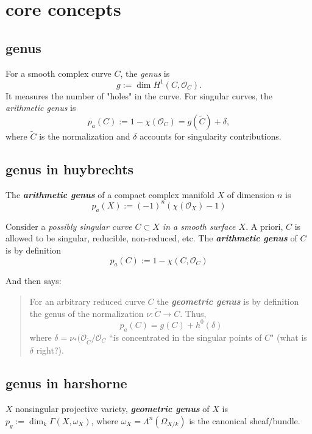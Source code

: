 \section{core concepts}

\subsection{genus}
For a smooth complex curve \( C \), the \emph{genus} is
\[
g := \dim H^1(C, \mathcal{O}_C).
\]
It measures the number of "holes" in the curve. For singular curves, the \emph{arithmetic genus} is
\[
p_a(C) := 1 - \chi(\mathcal{O}_C) = g(\widetilde{C}) + \delta,
\]
where \( \widetilde{C} \) is the normalization and \( \delta \) accounts for singularity contributions.

\subsection*{genus in huybrechts}
\begin{defn}\leavevmode
The \textit{\textbf{arithmetic genus}} of a compact complex manifold \(X\) of dimension \(n\) is
\[\boxed{p_a(X):=(-1)^n (\chi(\mathcal{O}_X)-1)}\]
\end{defn}

\begin{defn}\leavevmode
	Consider a \textit{possibly singular curve \(C \subset X\) in a smooth surface \(X\)}. A priori, \(C\) is allowed to be singular, reducible, non-reduced, etc. The \textit{\textbf{arithmetic genus}} of \(C\) is by definition
	\[\boxed{p_a(C):= 1 - \chi(C, \mathcal{O}_C)}\]
\end{defn}

And then \cite{huk} says:
\begin{quotation}
For an arbitrary reduced curve \(C\) the \textit{\textbf{geometric genus}} is by definition the genus of the normalization \(\nu:\tilde{C} \to C\). Thus, \[\boxed{p_a(C)=g(C)+h^{0}(\delta)}\]
where \(\delta=\nu_*(\mathcal{O}_{\tilde{C}}/\mathcal{O}_C\) ``is concentrated in the singular points of \(C\)" (what is \(\delta\) right?).
\end{quotation}

\subsection*{genus in harshorne}
\begin{defn}\leavevmode
\(X\) nonsingular projective variety, \textit{\textbf{geometric genus}} of \(X\) is \(p_g:=\dim_k\Gamma(X,\omega_X)\), where \(\omega_X=\Lambda^{n}(\Omega_{X/k})\) is the canonical sheaf/bundle.
\end{defn}

